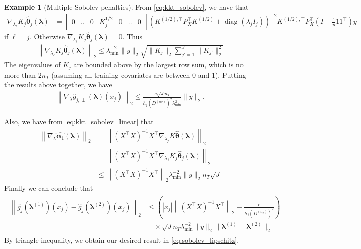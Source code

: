 \documentclass[10pt]{book}
\theoremstyle{definition}
\newtheorem{example}{Example}
\DeclareMathOperator{\diag}{diag}
\begin{document}
\begin{example}[Multiple Sobolev penalties]
	From \eqref{eq:kkt_sobolev}, we have that
	\begin{align}
	\nabla_{\lambda_\ell} K_j \hat{\boldsymbol{\theta}}_j(\boldsymbol{\lambda})
	& = 
	\left[
	\begin{matrix}
	0 & .. & 0 & K_j^{1/2} & 0 & .. & 0
	\end{matrix}
	\right]
	\left(
	K^{(1/2), \top} P_X^\top K^{(1/2)} + \diag(\lambda_j I_j)
	\right)^{-2}
	K^{(1/2), \top}
	P_X^\top (I - \frac{1}{n} 1 1^\top) y
	\end{align}
	if $\ell = j$.
	Otherwise $\nabla_{\lambda_\ell} K_j \hat{\boldsymbol{\theta}}_j(\boldsymbol{\lambda}) = 0$.
	Thus
	\begin{align}
	\left\|
	\nabla_{\lambda_\ell} K_j \hat{\boldsymbol{\theta}}_j(\boldsymbol{\lambda})
	\right \|_2
	\le
	\lambda_{\min}^{-2} \|y\|_2 \sqrt{\|K_j\|_2 \sum_{{j'}=1}^J \|K_{j'}\|_2^2}
	\end{align}
	The eigenvalues of $K_j$ are bounded above by the largest row sum, which is no more than $2 n_T$ (assuming all training covariates are between 0 and 1).
	Putting the results above together, we have
	\begin{align}
	\left \|
	\nabla_{\lambda} \hat{g}_{j, \perp}(\boldsymbol{\lambda})(x_j)
	\right \|_2
	\le
	\frac{c \sqrt{J} n_T}{h_j(D^{(n_T)})^2 \lambda_{\min}^2}
	\|y\|_2.
	\end{align}
	
	Also, we have from \eqref{eq:kkt_sobolev_linear} that
	\begin{align}
	\left \| \nabla_{\lambda} \hat{\boldsymbol{\alpha}_1}(\boldsymbol{\lambda}) \right \|_2
	& =
	\left \|
	\left(
	X^\top X
	\right)^{-1}
	X^\top
	\nabla_{\lambda_j} K \hat{\boldsymbol{\theta}}(\boldsymbol{\lambda})
	\right \|_2 \\
	& =
	\left \|
	\left(
	X^\top X
	\right)^{-1}
	X^\top
	\nabla_{\lambda_j} K_j \hat{\boldsymbol{\theta}}_j(\boldsymbol{\lambda})
	\right \|_2 \\
	& \le
	\left \|
	\left(
	X^\top X
	\right)^{-1}
	X^\top
	\right \|_2
	\lambda_{\min}^{-2} \|y\|_2 n_T \sqrt{J}
	\end{align}
	Finally we can conclude that
	\begin{align}
	\begin{split}
	\left \|
	\hat{g}_j(\boldsymbol{\lambda}^{(1)})(x_j)
	- \hat{g}_j(\boldsymbol{\lambda}^{(2)})(x_j)
	\right \|_2
	& \le
	\left(
	|x_j|
	\left \|
	\left(
	X^\top X
	\right)^{-1}
	X^\top
	\right \|_2
	+
	\frac{c }{h_j(D^{(n_T)})^2}
	\right)\\
	& \quad \times
	\sqrt{J}
	n_T
	\lambda_{\min}^{-2}
	\|y\|_2
	\| \boldsymbol{\lambda}^{(1)} - \boldsymbol{\lambda}^{(2)}\|_2
	\end{split}
	\end{align}
	By triangle inequality, we obtain our desired result in \eqref{eq:sobolev_lipschitz}.
\end{example}
\end{document}
